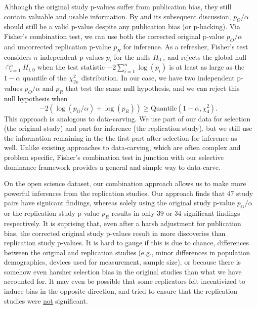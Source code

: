 \documentclass{article}
\begin{document}
Although the original study p-values suffer from publication bias, they still contain valuable and usable information. By  and its subsequent discussion, $p_O/\alpha$ should still be a valid p-value despite any publication bias (or p-hacking). Via Fisher's combination test, we can use both the corrected original p-value $p_O/\alpha$ and uncorrected replication p-value $p_R$ for inference. As a refresher, Fisher's test considers $n$ independent p-values $p_i$ for the nulls $H_{0, i}$ and rejects the global null $\cap_{i=1}^n H_{i, 0}$ when the test statistic $-2 \sum_{i=1}^n \log(p_i) $ is at least as large as the $1-\alpha$ quantile of the $\chi^2_{2n}$ distribution. In our case, we have two independent p-values $p_O/\alpha$ and $p_R$ that test the same null hypothesis, and we can reject this null hypothesis when 
\begin{equation*}
    -2 (\log(p_O/\alpha) + \log(p_R)) \geq \text{Quantile}(1-\alpha, \chi^2_4). 
\end{equation*}
This approach is analogous to data-carving. We use part of our data for selection (the original study) and part for inference (the replication study), but we still use the information remaining in the the first part after selection for inference as well. Unlike existing approaches to data-carving, which are often complex and problem specific, Fisher's combination test in junction with our selective dominance framework provides a general and simple way to data-carve. 

On the open science dataset, our combination approach allows us to make more powerful inferences from the replication studies. Our approach finds that 47 study pairs have signicant findings, whereas solely using the original study p-value $p_O/\alpha$ or the replication study p-value $p_R$ results in only 39 or 34 significant findings respectively. It is suprising that, even after a harsh adjustment for publication bias, the corrected original study p-values result in more discoveries than replication study p-values. It is hard to gauge if this is due to chance, differences between the original and replication studies (e.g., minor differences in population demographics, devices used for measurement, sample size), or because there is somehow even harsher selection bias in the original studies than what we have accounted for. It may even be possible that some replicators felt incentivized to induce bias in the opposite direction, and tried to ensure that the replication studies were \underline{not} significant. 
\end{document}
